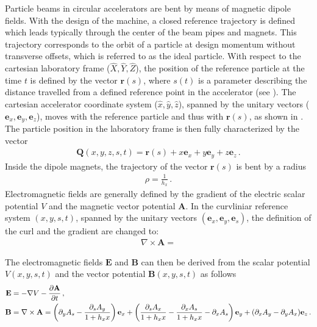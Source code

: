 Particle beams in circular accelerators are bent by means of magnetic dipole fields. With the design of the machine, a closed reference trajectory is defined which leads typically through the center of the beam pipes and magnets. This trajectory corresponds to the orbit of a particle at design momentum without transverse offsets, which is referred to as the ideal particle. With respect to the cartesian laboratory frame ($\hat X, \hat Y, \hat Z$), the position of the reference particle at the time $t$ is defined by the vector $\textbf{r}(s)$, where $s(t)$ is a parameter describing the distance travelled from a defined reference point in the accelerator (see ). The cartesian accelerator coordinate system ($\hat x, \hat y, \hat z$), spanned by the unitary vectors ($\textbf{e}_x, \textbf{e}_y, \textbf{e}_z$), moves with the reference particle and thus with $\textbf{r}(s)$, as shown in . The particle position in the laboratory frame is then fully characterized by the vector
%
\begin{align}
\textbf{Q}(x,y,z,s,t) = \textbf{r} (s) + x \textbf{e}_x + y \textbf{e}_y + z \textbf{e}_z \, . \label{eq:refframe}
\end{align}
%
Inside the dipole magnets, the trajectory of the vector $\textbf{r}(s)$ is bent by a radius 
\begin{align}
\rho = \frac{1}{h_x} \, .
\end{align}
%
%
Electromagnetic fields are generally defined by the gradient of the electric scalar potential $V$ and the magnetic vector potential $\textbf{A}$. In the curvliniar reference system $(x,y,s,t)$, spanned by the unitary vectors $(\textbf{e}_x,\textbf{e}_y,\textbf{e}_s)$, the definition of the curl and the gradient are changed to:
\begin{align}
\nabla \times \textbf{A} = 
\end{align}

The electromagnetic fields $\textbf{E}$ and $\textbf{B}$ can then be derived from the scalar potential $V(x,y,s,t)$ and the vector potential $\textbf{B}(x,y,s,t)$ as follows
\begin{align}
\textbf{E} &= -\nabla V - \frac{\partial \textbf{A}}{\partial t}  \, , \\
\textbf{B} &= \nabla \times \textbf{A} = \left( \partial_y A_s - \frac{\partial_s A_y}{1+h_x x } \right) \textbf{e}_x + \left( \frac{\partial_s A_x}{1+h_x x} - \frac{\partial_x A_s}{1+h_x x}  - \partial_x A_s \right) \textbf{e}_y + (\partial_x A_y - \partial_y A_x) \textbf{e}_z \, .
\end{align}


